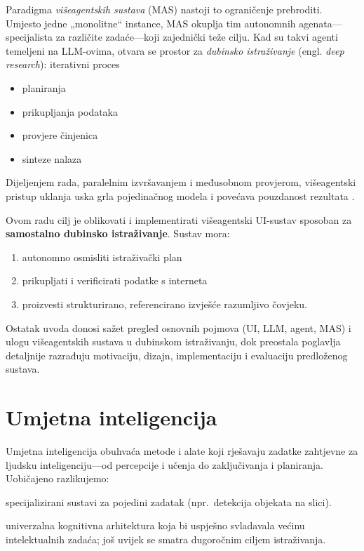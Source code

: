 \documentclass[zavrsnirad]{fer}
\begin{document}
Paradigma \emph{višeagentskih sustava} (MAS) nastoji to ograničenje
prebroditi. Umjesto jedne „monolitne“ instance, MAS okuplja tim
autonomnih agenata—specijalista za različite zadaće—koji zajednički
teže cilju. Kad su takvi agenti temeljeni na LLM-ovima,
otvara se prostor za \emph{dubinsko istraživanje} (engl. \emph{deep
research}): iterativni proces
\begin{itemize}
  \item planiranja
  \item prikupljanja podataka
  \item provjere činjenica
  \item sinteze nalaza
\end{itemize}
Dijeljenjem rada, paralelnim izvršavanjem i međusobnom provjerom,
višeagentski pristup uklanja uska grla pojedinačnog modela
i povećava pouzdanost rezultata \cite{wooldridge1995,tweedale2007}.

\newpage
\noindent
Ovom radu cilj je oblikovati i implementirati
višeagentski UI-sustav sposoban za \textbf{samostalno dubinsko
istraživanje}. Sustav mora:
\begin{enumerate}
  \item autonomno osmisliti istraživački plan
  \item prikupljati i verificirati podatke s interneta
  \item proizvesti strukturirano, referencirano izvješće razumljivo
        čovjeku.
\end{enumerate}

\bigskip
Ostatak uvoda donosi sažet pregled osnovnih pojmova (UI, LLM, agent,
MAS) i ulogu višeagentskih sustava u dubinskom istraživanju, dok
preostala poglavlja detaljnije razrađuju motivaciju, dizajn,
implementaciju i evaluaciju predloženog sustava.
\section{Umjetna inteligencija}
\label{subsec:UI}

Umjetna inteligencija obuhvaća metode i alate koji rješavaju zadatke
zahtjevne za ljudsku inteligenciju—od
percepcije i učenja do zaključivanja i planiranja.
Uobičajeno razlikujemo:
\begin{description}[labelwidth=3.4cm,leftmargin=3.6cm]
  \item[Uska UI] specijalizirani sustavi za pojedini zadatak
        (npr.\ detekcija objekata na slici).
  \item[Opća UI] univerzalna kognitivna arhitektura koja bi uspješno
        svladavala većinu intelektualnih zadaća; još uvijek se smatra
        dugoročnim ciljem istraživanja.
\end{description}
\end{document}
